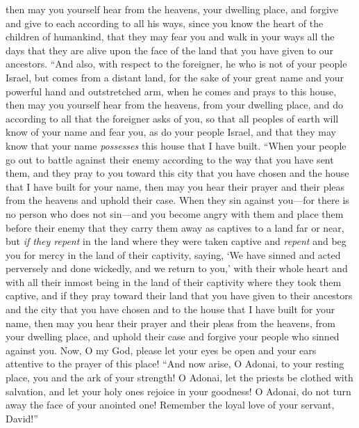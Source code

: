 \begin{biblechapter}
\verse then may you yourself hear from the heavens, your dwelling place, and forgive and give to each according to all his ways, since you know the heart of the children of humankind,
\verse that they may fear you and walk in your ways all the days that they are alive upon the face of the land that you have given to our ancestors.
\verse “And also, with respect to the foreigner, he who is not of your people Israel, but comes from a distant land, for the sake of your great name and your powerful hand and outstretched arm, when he comes and prays to this house,
\verse then may you yourself hear from the heavens, from your dwelling place, and do according to all that the foreigner asks of you, so that all peoples of earth will know of your name and fear you, as do your people Israel, and that they may know that your name \textit{possesses} this house that I have built.
\verse “When your people go out to battle against their enemy according to the way that you have sent them, and they pray to you toward this city that you have chosen and the house that I have built for your name,
\verse then may you hear their prayer and their pleas from the heavens and uphold their case.
\verse When they sin against you—for there is no person who does not sin—and you become angry with them and place them before their enemy that they carry them away as captives to a land far or near,
\verse but \textit{if they repent} in the land where they were taken captive and \textit{repent} and beg you for mercy in the land of their captivity, saying, ‘We have sinned and acted perversely and done wickedly,
\verse and we return to you,’ with their whole heart and with all their inmost being in the land of their captivity where they took them captive, and if they pray toward their land that you have given to their ancestors and the city that you have chosen and to the house that I have built for your name,
\verse then may you hear their prayer and their pleas from the heavens, from your dwelling place, and uphold their case and forgive your people who sinned against you.
\verse Now, O my God, please let your eyes be open and your ears attentive to the prayer of this place!
\verse “And now arise, O Adonai, to your resting place, you and the ark of your strength! O Adonai, let the priests be clothed with salvation, and let your holy ones rejoice in your goodness!
\verse O Adonai, do not turn away the face of your anointed one! Remember the loyal love of your servant, David!”
\end{biblechapter}

